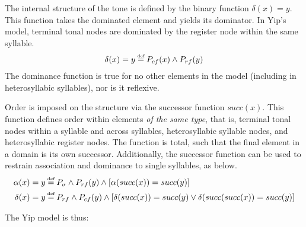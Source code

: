 \documentclass{article}
\newcommand\myeq{\mathrel{\stackrel{\makebox[0pt]{\mbox{\normalfont\tiny def}}}{=}}}
\begin{document}
The internal structure of the tone is defined by the binary function $\delta(x)=y$. This function takes the dominated element and yields its dominator. In Yip's model, terminal tonal nodes are dominated by the register node within the same syllable.
\begin{equation}
\delta(x)=y\myeq P_{cf}(x)\land P_{rf}(y)
\end{equation}
The dominance function is true for no other elements in the model (including in heterosyllabic syllables), nor is it reflexive. \par
Order is imposed on the structure via the successor function $succ(x)$. This function defines order within elements \emph{of the same type}, that is, terminal tonal nodes within a syllable and across syllables, heterosyllabic syllable nodes, and heterosyllabic register nodes. The function is total, such that the final element in a domain is its own successor. Additionally, the successor function can be used to restrain association and dominance to single syllables, as below.
\begin{equation}
\begin{aligned}
\alpha(x)=y&\myeq P_{\sigma} \land P_{rf}(y) \land [\alpha(succ(x)) = succ(y)]\\
\delta(x)=y&\myeq P_{rf} \land P_{cf}(y) \land [\delta(succ(x)) = succ(y)\lor \delta(succ(succ(x))=succ(y)]\\
\end{aligned}
\end{equation} \par
The Yip model is thus:
\end{document}
